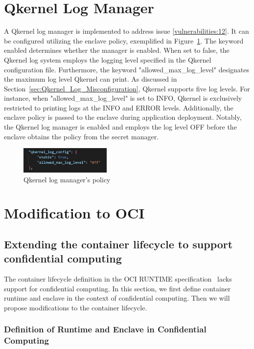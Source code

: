 \section{Qkernel Log Manager}
\label{sec:Qkernel_logger}
A Qkernel log manager is implemented to address issue \ref{vulnerabilities:12}. It can be configured utilizing the enclave policy, exemplified in Figure~\ref{fig:qkernel_Log_config}. The keyword enabled determines whether the manager is enabled. When set to false, the Qkernel log system employs the logging level specified in 
the Qkernel configuration file. Furthermore, the keyword "allowed\_max\_log\_level" designates the maximum log level Qkernel can print. As discussed in Section~\ref{sec:Qkernel_Log_Misconfiguration}, Qkernel supports five log levels. For instance, when "allowed\_max\_log\_level" is set to INFO, Qkernel is exclusively restricted to printing 
logs at the INFO and ERROR levels. Additionally, the enclave policy is passed to the enclave during application deployment. Notably, the Qkernel log manager is enabled and employs the log level OFF before the enclave obtains the policy from the secret manager.
\begin{figure}[!htb]
    \centering
    \includegraphics[width=0.4\textwidth]{images/qkernel_Log_config.png}
    \caption[Qkernel log manager's policy]{Qkernel log manager's policy}
    \label{fig:qkernel_Log_config}
\end{figure}

\section{Modification to OCI}
\label{sec:Modification_OCI}

\subsection{Extending the container lifecycle to support confidential computing}
The container lifecycle definition in the OCI RUNTIME specification~\cite*{oci-runtime-spec} lacks support for confidential computing. In this section, we first define container runtime and enclave in the context of confidential computing. Then we will propose modifications to the container 
lifecycle.


\subsubsection{Definition of Runtime and Enclave in Confidential Computing}

